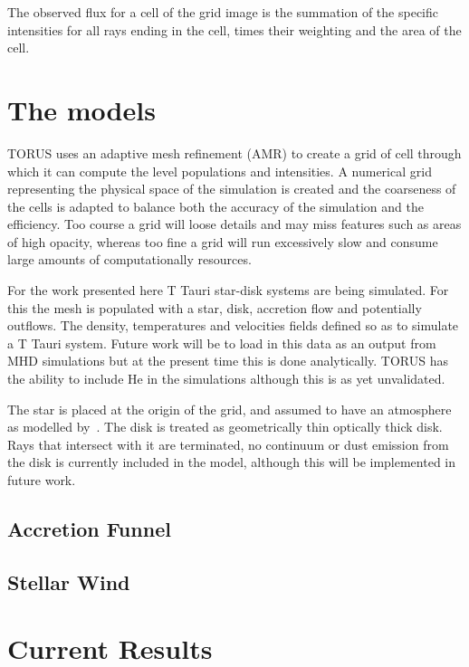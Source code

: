 \documentclass[fleqn,usenatbib]{mnras}
\begin{document}
The observed flux for a cell of the grid image is the summation of the specific intensities for all rays ending in the cell, times their weighting and the area of the cell.

\section{The models}
\label{sec:model}
TORUS uses an adaptive mesh refinement (AMR) to create a grid of cell through which it can compute the level populations and intensities.  A numerical grid representing the physical space of the simulation is created and the coarseness of the cells is adapted to balance both the accuracy of the simulation and the efficiency. Too course a grid will loose details and may miss features such as areas of high opacity, whereas too fine a grid will run excessively slow and consume large amounts of computationally resources.

For the work presented here T Tauri star-disk systems are being simulated. For this the mesh is populated with a star, disk, accretion flow and potentially outflows. The density, temperatures and velocities fields defined so as to simulate a T Tauri system. Future work will be to load in this data as an output from MHD simulations but at the present time this is done analytically. TORUS has the ability to include He in the simulations although this is as yet unvalidated. 

The star is placed at the origin of the grid, and assumed to have an atmosphere as modelled by~\citet{1979ApJS...40....1K}. The disk is treated as geometrically thin optically thick disk. Rays that intersect with it are terminated, no continuum or dust emission from the disk is currently included in the model, although this will be implemented in future work.

\subsection{Accretion Funnel}

\subsection{Stellar Wind}

\section{Current Results}
\label{sec:results}
\end{document}
